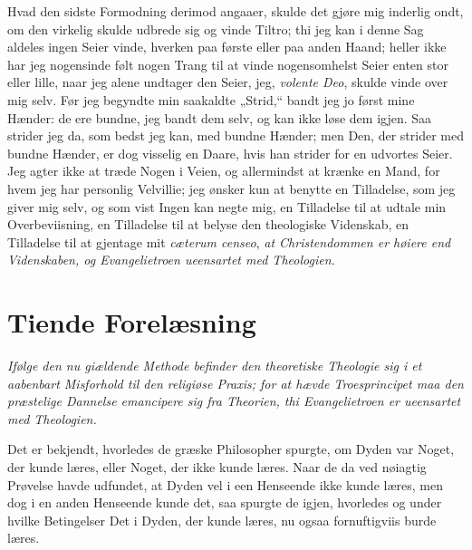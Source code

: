 \documentclass[12pt,a4paper]{book}
\newcommand{\opage}[1]{\marginnote{\footnotesize\textit{[#1]}}}
\begin{document}
Hvad den sidste Formodning derimod angaaer, skulde det gjøre mig inderlig
ondt, om den virkelig skulde udbrede sig og vinde Tiltro; thi jeg kan i denne
Sag aldeles ingen Seier vinde, hverken paa første eller paa anden Haand; heller
ikke har jeg nogensinde følt nogen Trang til at vinde nogensomhelst Seier enten
stor eller lille, naar jeg alene undtager den Seier, jeg, \textit{volente Deo},
skulde vinde over mig selv. Før jeg begyndte min saakaldte „Strid,“ bandt jeg
jo først mine Hænder: de ere bundne, jeg bandt dem selv, og kan ikke løse dem
igjen. Saa strider jeg da, som bedst jeg kan, med bundne Hænder; men Den, der
strider med bundne Hænder, er dog visselig en Daare, hvis han strider for en
udvortes Seier. Jeg agter ikke at træde Nogen i Veien, og allermindst at krænke
en Mand, for hvem jeg har personlig Velvillie; jeg ønsker kun at benytte en
Tilladelse, som jeg giver mig selv, og som vist Ingen kan negte mig, en
Tilladelse til at udtale min Overbeviisning, en Tilladelse til at belyse den
theologiske Videnskab, en Tilladelse til at gjentage mit \textit{cæterum
censeo}, \emph{at Christendommen er høiere end Videnskaben, og Evangelietroen
ueensartet med Theologien.}

\chapter*{Tiende Forelæsning}
\label{ch:forel10}

\begin{center}\itshape
Ifølge den nu giældende Methode befinder den theoretiske Theologie sig i
et aabenbart Misforhold til den religiøse Praxis; for at hævde
Troesprincipet maa den præstelige Dannelse emancipere sig fra Theorien,
thi Evangelietroen er ueensartet med Theologien.
\end{center}

\opage{129} Det er bekjendt, hvorledes de græske Philosopher spurgte, om Dyden var
Noget, der kunde læres, eller Noget, der ikke kunde læres. Naar de da ved
nøiagtig Prøvelse havde udfundet, at Dyden vel i een Henseende ikke kunde
læres, men dog i en anden Henseende kunde det, saa spurgte de igjen,
hvorledes og under hvilke Betingelser Det i Dyden, der kunde læres, nu
ogsaa fornuftigviis burde læres.
\end{document}
